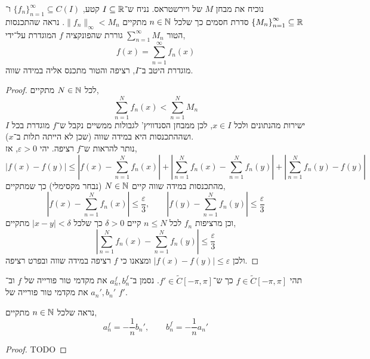 \question{}
נוכיח את מבחן $M$ של ויירשטראס.
נניח ש־$I \subseteq \mathbb{R}$ קטע, ${\{ f_n \}}_{n = 1}^\infty \subseteq C(I)$ ו־${\{ M_n \}}_{n = 1}^\infty \subseteq \mathbb{R}$ סדרת חסמים כך שלכל $n \in \mathbb{N}$ מתקיים $\lVert f_n \rVert_\infty < M_n$.
נראה שהתכנסות הטור $\sum_{n = 1}^\infty M_n$ גוררת שהפונקציה $f$ המוגדרת על־ידי,
\[
	f(x)
	= \sum_{n = 1}^\infty f_n(x)
\]
מוגדרת היטב ב־$I$, רציפה והטור מתכנס אליה במידה שווה.
\begin{proof}
	לכל $N \in \mathbb{N}$ מתקיים,
	\[
		\sum_{n = 1}^N f_n(x)
		< \sum_{n = 1}^N M_n
	\]
	ישירות מהנתונים ולכל $x \in I$, לכן ממבחן הסנדוויץ' לגבולות ממשיים נקבל ש־$f$ מוגדרת בכל $I$ ושההתכנסות היא במידה שווה (שכן לא הייתה תלות ב־$x$). \\
	נותר להראות ש־$f$ רציפה.
	יהי $\varepsilon > 0$, אז,
	\[
		|f(x) - f(y)|
		\le \left\lvert f(x) - \sum_{n = 1}^N f_n(x) \right\rvert + \left\lvert \sum_{n = 1}^N f_n(x) - \sum_{n = 1}^N f_n(y) \right\rvert + \left\lvert \sum_{n = 1}^N f_n(y) - f(y) \right\rvert
	\]
	מהתכנסות במידה שווה קיים $N \in \mathbb{N}$ (נבחר מקסימלי) כך שמתקיים,
	\[
		\left\lvert f(x) - \sum_{n = 1}^N f_n(x) \right\rvert
		\le \frac{\varepsilon}{3},
		\qquad
		\left\lvert f(y) - \sum_{n = 1}^N f_n(y) \right\rvert
		\le \frac{\varepsilon}{3}
	\]
	וכן מרציפות $f_n$ לכל $n \le N$ קיים $\delta > 0$ כך שלכל $|x - y| < \delta$ מתקיים,
	\[
		\left\lvert \sum_{n = 1}^N f_n(x) - \sum_{n = 1}^N f_n(y) \right\rvert
		\le \frac{\varepsilon}{3}
	\]
	ולכן $|f(x) - f(y)| \le \varepsilon$ ומצאנו כי $f$ רציפה במידה שווה ובפרט רציפה.
\end{proof}

\question{}
תהי $f \in \tilde{C}[-\pi, \pi]$ כך ש־$f' \in \tilde{C}[-\pi, \pi]$.
נסמן ב־$a_n^f, b_n^f$ את מקדמי טור פורייה של $f$ וב־$a_n', b_n'$ את מקדמי טור פורייה של $f'$.

\subquestion{}
נראה שלכל $n \in \mathbb{N}$ מתקיים,
\[
	a_n^f
	= - \frac{1}{n} b_n',
	\qquad
	b_n^f
	= - \frac{1}{n} a_n'
\]
\begin{proof}
	TODO
\end{proof}


